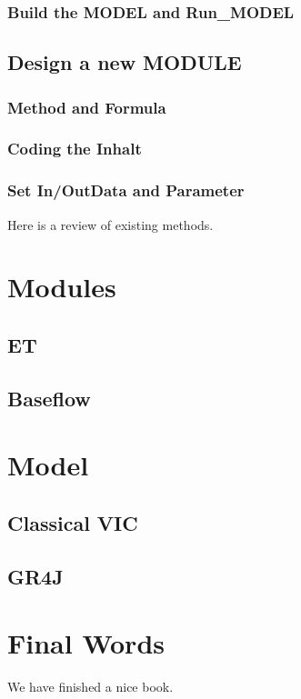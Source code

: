 \documentclass[
]{book}
\begin{document}
\hypertarget{build-the-model-and-run_model}{%
\subsection{Build the MODEL and Run\_MODEL}\label{build-the-model-and-run_model}}

\hypertarget{design-a-new-module}{%
\section{Design a new MODULE}\label{design-a-new-module}}

\hypertarget{method-and-formula}{%
\subsection{Method and Formula}\label{method-and-formula}}

\hypertarget{coding-the-inhalt}{%
\subsection{Coding the Inhalt}\label{coding-the-inhalt}}

\hypertarget{set-inoutdata-and-parameter}{%
\subsection{Set In/OutData and Parameter}\label{set-inoutdata-and-parameter}}

Here is a review of existing methods.

\hypertarget{module}{%
\chapter{Modules}\label{module}}

\hypertarget{et}{%
\section{ET}\label{et}}

\hypertarget{baseflow}{%
\section{Baseflow}\label{baseflow}}

\hypertarget{model}{%
\chapter{Model}\label{model}}

\hypertarget{classical-vic}{%
\section{Classical VIC}\label{classical-vic}}

\hypertarget{gr4j}{%
\section{GR4J}\label{gr4j}}

\hypertarget{final-words}{%
\chapter{Final Words}\label{final-words}}

We have finished a nice book.

  
\end{document}
